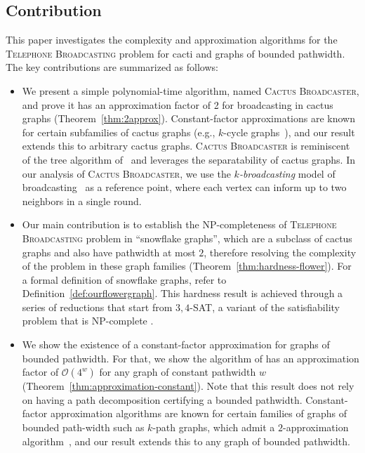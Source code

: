 \documentclass[letterpaper,11pt]{article}
\newcommand{\flower}{snowflake\xspace}
\newcommand{\fast}{\textit{$k$-broadcasting}\xspace}
\newcommand{\oh}{\mathcal{O}}
\newcommand{\telebr}{\textsc{Telephone Broadcasting}\xspace}
\newcommand{\sssattt}{\textsc{$3,4$-SAT}\xspace}
\newcommand{\ouralgo}{\textsc{Cactus Broadcaster}\xspace}
\newcommand{\pwidth}{w}
\begin{document}
\subsection{Contribution}
This paper investigates the complexity and approximation algorithms for the \telebr problem for cacti and graphs of bounded pathwidth. The key contributions are summarized as follows: \vspace{1mm}
\begin{itemize}
    \item We present a simple polynomial-time algorithm, named \ouralgo, and prove it has an approximation factor of 2 for broadcasting in cactus graphs (Theorem~\ref{thm:2approx}). Constant-factor approximations are known for certain subfamilies of cactus graphs (e.g., $k$-cycle graphs~\cite{BhabakH15}), and our result extends this to arbitrary cactus graphs.   
\ouralgo is  
reminiscent of the tree algorithm of~\cite{fraigniaud2002polynomial} and leverages the separatability of cactus graphs. 
In our analysis of \ouralgo, we use the \fast model of broadcasting~\cite{grigni1991tightkbroad} as a reference point, where each vertex can inform up to two neighbors in a single round. 

\item Our main contribution is to establish the NP-completeness of \telebr problem in ``\flower graphs'', which are a subclass of cactus graphs and also have pathwidth at most $2$, therefore resolving the complexity of the problem in these graph families (Theorem~\ref{thm:hardness-flower}). For a formal definition of \flower graphs, refer to Definition~\ref{def:ourflowergraph}. This hardness result is achieved through a series of reductions that start from \sssattt, a variant of the satisfiability problem that is NP-complete
\cite{tovey1984simplified}. 
    \item We show the existence of a constant-factor approximation for graphs of bounded pathwidth.  
    For that, we 
    show the algorithm of \citet{elkin2006sublogarithmic} has an approximation factor of 
$\oh(4^\pwidth)$ for any graph of constant pathwidth $\pwidth$ (Theorem~\ref{thm:approximation-constant}). Note that this result does not rely on having a path decomposition certifying a bounded pathwidth. 
Constant-factor approximation algorithms are known for certain families of graphs of bounded path-width such as 
$k$-path graphs, which admit a $2$-approximation algorithm~\cite{harutyunyan2023kpath}, and our result extends this to any graph of bounded pathwidth. 
\end{itemize}
\end{document}
